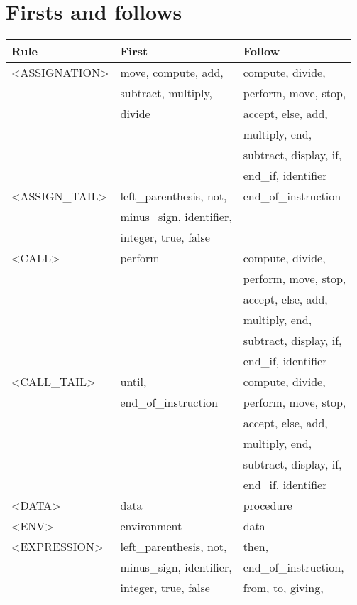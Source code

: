 \newpage\cleardoublepage{}
\section{Firsts and follows}
\label{app:firsts and follows}

\begin{longtable}{|l|l|l|}
\hline
\textbf{Rule}        &   \textbf{First}       &   \textbf{Follow}      \\
\hline
<ASSIGNATION>  &  move, compute, add, &   compute, divide, \\ 
  &  subtract, multiply, &   perform, move, stop, \\ 
  &  divide&   accept, else, add, \\ 
  &  &   multiply, end, \\ 
  &  &   subtract, display, if, \\ 
  &  &   end\_if, identifier\\ 
  \hline
<ASSIGN\_TAIL>  &  left\_parenthesis, not, &   end\_of\_instruction\\ 
  &  minus\_sign, identifier, &   \\ 
  &  integer, true, false&   \\ 
  \hline
<CALL>  &  perform&   compute, divide, \\ 
  &  &   perform, move, stop, \\ 
  &  &   accept, else, add, \\ 
  &  &   multiply, end, \\ 
  &  &   subtract, display, if, \\ 
  &  &   end\_if, identifier\\ 
  \hline
<CALL\_TAIL>  &  until, &   compute, divide, \\ 
  &  end\_of\_instruction&   perform, move, stop, \\ 
  &  &   accept, else, add, \\ 
  &  &   multiply, end, \\ 
  &  &   subtract, display, if, \\ 
  &  &   end\_if, identifier\\ 
  \hline
<DATA>  &  data&   procedure\\ 
  \hline
<ENV>  &  environment&   data\\ 
  \hline
<EXPRESSION>  &  left\_parenthesis, not, &   then, \\ 
  &  minus\_sign, identifier, &   end\_of\_instruction, \\ 
  &  integer, true, false&   from, to, giving, \\ 

\end{longtable}
